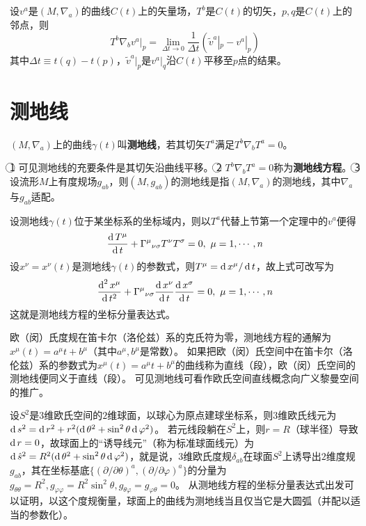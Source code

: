 \begin{theorem}
设$v^a$是$(M, \nabla_a)$的曲线$C(t)$上的矢量场，$T^b$是$C(t)$的切矢，$p, q$是$C(t)$上的邻点，则
$$T^b\nabla_bv^a|_p = \lim_{\Delta t \to 0}\frac{1}{\Delta t}(\tilde v^a|_p - v^a|_p)$$
其中$\Delta t \equiv t(q) - t(p)$，$\tilde v^a|_p$是$v^a|_q$沿$C(t)$平移至$p$点的结果。
\end{theorem}

\section{测地线}

\begin{definition}
$(M, \nabla_a)$上的曲线$\gamma(t)$叫\textbf{测地线}，若其切矢$T^a$满足$T^b\nabla_bT^a = 0$。
\end{definition}

\begin{note}
\textcircled{1} 可见测地线的充要条件是其切矢沿曲线平移。
\textcircled{2} $T^b\nabla_bT^a = 0$称为\textbf{测地线方程}。
\textcircled{3} 设流形$M$上有度规场$g_{ab}$，则$(M, g_{ab})$的测地线是指$(M, \nabla_a)$的测地线，其中$\nabla_a$与$g_{ab}$适配。
\end{note}

设测地线$\gamma(t)$位于某坐标系的坐标域内，则以$T^a$代替上节第一个定理中的$v^a$便得
$$\frac{\operatorname{d} T^\mu}{\operatorname{d} t} + \Gamma^\mu{}_{\nu\sigma}T^\nu T^\sigma = 0, ~ \mu = 1, \cdots, n$$
设$x^\nu = x^\nu(t)$是测地线$\gamma(t)$的参数式，则$T^\mu = \operatorname{d} x^\mu / \operatorname{d} t$，故上式可改写为
$$\frac{\operatorname{d}^2x^\mu}{\operatorname{d} t^2} + \Gamma^\mu{}_{\nu\sigma}\frac{\operatorname{d} x^\nu}{\operatorname{d} t}\frac{\operatorname{d} x^\sigma}{\operatorname{d} t} = 0, ~ \mu = 1, \cdots, n$$
这就是测地线方程的坐标分量表达式。

\begin{example}
欧（闵）氏度规在笛卡尔（洛伦兹）系的克氏符为零，测地线方程的通解为$x^\mu(t) = a^\mu t + b^\mu$（其中$a^\mu, b^\mu$是常数）。
如果把欧（闵）氏空间中在笛卡尔（洛伦兹）系的参数式为$x^\mu(t) = a^\mu t + b^\mu$的曲线称为直线（段），欧（闵）氏空间的测地线便同义于直线（段）。
可见测地线可看作欧氏空间直线概念向广义黎曼空间的推广。
\end{example}

\begin{example}
设$S^2$是$3$维欧氏空间的$2$维球面，以球心为原点建球坐标系，则$3$维欧氏线元为$\operatorname{d} s^2 = \operatorname{d} r^2 + r^2(\operatorname{d} \theta^2 + \sin^2\theta\operatorname{d}\varphi^2)$。
若元线段躺在$S^2$上，则$r = R$（球半径）导致$\operatorname{d} r = 0$，故球面上的``诱导线元''（称为标准球面线元）为$\operatorname{d}\hat{s}^2 = R^2(\operatorname{d} \theta^2 + \sin^2\theta\operatorname{d}\varphi^2)$，就是说，$3$维欧氏度规$\delta_{ab}$在球面$S^2$上诱导出$2$维度规$g_{ab}$，其在坐标基底$\{(\partial / \partial\theta)^a, (\partial / \partial\varphi)^a\}$的分量为$g_{\theta\theta} = R^2, g_{\varphi\varphi} = R^2\sin^2\theta, g_{\theta\varphi} = g_{\varphi\theta} = 0$。
从测地线方程的坐标分量表达式出发可以证明，以这个度规衡量，球面上的曲线为测地线当且仅当它是大圆弧（并配以适当的参数化）。
\end{example}

